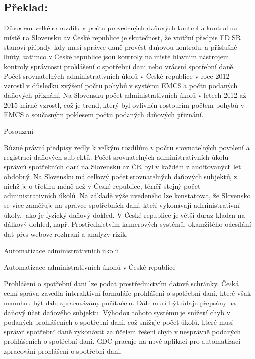 \documentclass[10pt]{article}
\begin{document}
\pagebreak

\subsection*{Překlad:}

Důvodem velkého rozdílu v počtu provedených daňových kontrol a kontrol na místě na Slovensku av České republice je skutečnost, že vnitřní předpis FD SR stanoví případy, kdy musí správce daně provést daňovou kontrolu. a příslušné lhůty, zatímco v České republice jsou kontroly na místě hlavním nástrojem kontroly správnosti prohlášení o spotřební dani nebo vrácení spotřební daně.
Počet srovnatelných administrativních úkolů v České republice v roce 2012 vzrostl v důsledku zvýšení počtu pohybů v systému EMCS a počtu podaných daňových přiznání.
Na Slovensku počet administrativních úkolů v letech 2012 až 2015 mírně vzrostl, což je trend, který byl ovlivněn rostoucím počtem pohybů v EMCS a současným poklesem počtu podaných daňových přiznání.


Posouzení

Různé právní předpisy vedly k velkým rozdílům v počtu srovnatelných povolení a registrací daňových subjektů.
Počet srovnatelných administrativních úkolů správců spotřebních daní na Slovensku av ČR byl v každém z auditovaných let obdobný.
Na Slovensku má celkový počet srovnatelných daňových subjektů, z nichž je o třetinu méně než v České republice, téměř stejný počet administrativních úkolů.
Na základě výše uvedeného lze konstatovat, že Slovensko se více zaměřuje na správce spotřebních daní, kteří vykonávají administrativní úkoly, jako je fyzický daňový dohled.
V České republice je větší důraz kladen na dálkový dohled, např. Prostřednictvím kamerových systémů, okamžitého odesílání dat přes webové rozhraní a analýzy rizik.


Automatizace administrativních úkolů



Automatizace administrativních úkonů v České republice

Prohlášení o spotřební dani lze podat prostřednictvím datové schránky.
Česká celní správa zavedla interaktivní formuláře prohlášení o spotřební dani, které však nemohou být dále zpracovávány počítačem.
Dále musí být údaje přepsány na daňový účet daňového subjektu.
Výhodou tohoto systému je snížení chyb v podaných prohlášeních o spotřební dani, což snižuje počet úkolů, které musí správci spotřební daně vykonávat za účelem řešení chyb v nesprávně podaných prohlášeních o spotřební dani.
GDC pracuje na nové aplikaci pro automatizaci zpracování prohlášení o spotřební dani.
\end{document}
